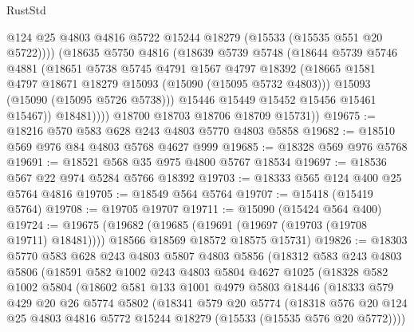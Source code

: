 \begin{lexlean}{RustStd}
\begin{coremodule}
                  @124
                  @25
                  @4803
                  @4816
                  @5722
                  @15244
                  @18279
                  (@15533 (@15535 @551 @20 @5722))))
              (@18635
                @5750
                @4816
                (@18639
                  @5739
                  @5748
                  (@18644
                    @5739
                    @5746
                    @4881
                    (@18651
                      @5738
                      @5745
                      @4791
                      @1567
                      @4797
                      @18392
                      (@18665 @1581 @4797 @18671 @18279 @15093 (@15090 (@15095 @5732 @4803)))
                      @15093
                      (@15090 (@15095 @5726 @5738)))
                    @15446
                    @15449
                    @15452
                    @15456
                    @15461
                    @15467))
                @18481))))
        @18700
        @18703
        @18706
        @18709
        @15731))
@19675 := @18216 @570 @583 @628 @243 @4803 @5770 @4803 @5858
@19682 := @18510 @569 @976 @84 @4803 @5768 @4627 @999
@19685 := @18328 @569 @976 @5768
@19691 := @18521 @568 @35 @975 @4800 @5767 @18534
@19697 := @18536 @567 @22 @974 @5284 @5766 @18392
@19703 := @18333 @565 @124 @400 @25 @5764 @4816
@19705 := @18549 @564 @5764
@19707 := @15418 (@15419 @5764)
@19708 := @19705 @19707
@19711 := @15090 (@15424 @564 @400)
@19724 := @19675
    (@19682
      (@19685 (@19691 (@19697 (@19703 (@19708 @19711) @18481))))
      @18566
      @18569
      @18572
      @18575
      @15731)
@19826 := @18303
    @5770
    @583
    @628
    @243
    @4803
    @5807
    @4803
    @5856
    (@18312
      @583
      @243
      @4803
      @5806
      (@18591
        @582
        @1002
        @243
        @4803
        @5804
        @4627
        @1025
        (@18328
          @582
          @1002
          @5804
          (@18602
            @581
            @133
            @1001
            @4979
            @5803
            @18446
            (@18333
              @579
              @429
              @20
              @26
              @5774
              @5802
              (@18341
                @579
                @20
                @5774
                (@18318
                  @576
                  @20
                  @124
                  @25
                  @4803
                  @4816
                  @5772
                  @15244
                  @18279
                  (@15533 (@15535 @576 @20 @5772))))

\end{coremodule}
\end{lexlean}
